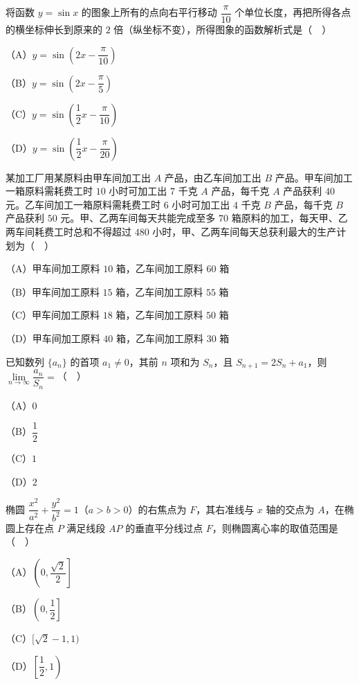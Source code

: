 \begin{question}
将函数 $y=\sin x$ 的图象上所有的点向右平行移动 $\dfrac{\pi}{10}$ 个单位长度，再把所得各点的横坐标伸长到原来的 $2$ 倍（纵坐标不变），所得图象的函数解析式是（　）

（A）$y=\sin\left(2x-\dfrac{\pi}{10}\right)$

（B）$y=\sin\left(2x-\dfrac{\pi}{5}\right)$

（C）$y=\sin\left(\dfrac{1}{2}x-\dfrac{\pi}{10}\right)$

（D）$y=\sin\left(\dfrac{1}{2}x-\dfrac{\pi}{20}\right)$

\end{question}
\begin{question}
某加工厂用某原料由甲车间加工出 $A$ 产品，由乙车间加工出 $B$ 产品。甲车间加工一箱原料需耗费工时 $10$ 小时可加工出 $7$ 千克 $A$ 产品，每千克 $A$ 产品获利 $40$ 元。乙车间加工一箱原料需耗费工时 $6$ 小时可加工出 $4$ 千克 $B$ 产品，每千克 $B$ 产品获利 $50$ 元。甲、乙两车间每天共能完成至多 $70$ 箱原料的加工，每天甲、乙两车间耗费工时总和不得超过 $480$ 小时，甲、乙两车间每天总获利最大的生产计划为（　）

（A）甲车间加工原料 $10$ 箱，乙车间加工原料 $60$ 箱

（B）甲车间加工原料 $15$ 箱，乙车间加工原料 $55$ 箱

（C）甲车间加工原料 $18$ 箱，乙车间加工原料 $50$ 箱

（D）甲车间加工原料 $40$ 箱，乙车间加工原料 $30$ 箱

\end{question}
\begin{question}
已知数列 $\{a_n\}$ 的首项 $a_1\neq0$，其前 $n$ 项和为 $S_n$，且 $S_{n+1}=2S_n+a_1$，则 $\lim\limits_{n\to\infty}\dfrac{a_n}{S_n}=$（　）

（A）$0$

（B）$\dfrac{1}{2}$

（C）$1$

（D）$2$

\end{question}
\begin{question}
椭圆 $\dfrac{x^2}{a^2}+\dfrac{y^2}{b^2}=1$（$a>b>0$）的右焦点为 $F$，其右准线与 $x$ 轴的交点为 $A$，在椭圆上存在点 $P$ 满足线段 $AP$ 的垂直平分线过点 $F$，则椭圆离心率的取值范围是（　）

（A）$\left(0,\dfrac{\sqrt2}{2}\right]$

（B）$\left(0,\dfrac{1}{2}\right]$

（C）$[\sqrt2-1,1)$

（D）$\left[\dfrac{1}{2},1\right)$

\end{question}
